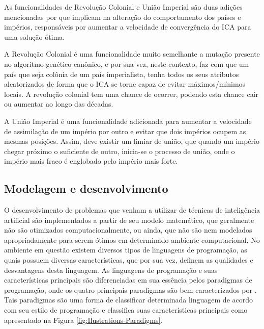 As funcionalidades de Revolução Colonial e União Imperial são duas adições mencionadas por \cite{roche2011imperialist} que implicam na alteração do comportamento dos países e impérios, responsáveis por aumentar a velocidade de convergência do ICA para uma solução ótima. 

A Revolução Colonial é uma funcionalidade muito semelhante a mutação presente no algoritmo genético canônico, e por sua vez, neste contexto, faz com que um país que seja colônia de um país imperialista, tenha todos os seus atributos aleatorizados de forma que o ICA se torne capaz de evitar máximos/mínimos locais. A revolução colonial tem uma chance de ocorrer, podendo esta chance cair ou aumentar ao longo das décadas.

A União Imperial é uma funcionalidade adicionada para aumentar a velocidade de assimilação de um império por outro e evitar que dois impérios ocupem as mesmas posições. Assim, deve existir um limiar de união, que quando um império chegar próximo o suficiente de outro, inicia-se o processo de união, onde o império mais fraco é englobado pelo império mais forte.
    
    
    
    
    
    
    
    
    
    
    
\subsection{Modelagem e desenvolvimento}
\label{Modelagem e desenvolvimento}

O desenvolvimento de problemas que venham a utilizar de técnicas de inteligência artificial são implementados a partir de seu modelo matemático, que geralmente não são otimizados computacionalmente, ou ainda, que não são nem modelados apropriadamente para serem ótimos em determinado ambiente computacional. No ambiente em questão existem diversos tipos de linguagens de programação, as quais possuem diversas características, que por sua vez, definem as qualidades e desvantagens desta linguagem. As linguagens de programação e suas características principais são diferenciadas em sua essência pelos paradigmas de programação, onde os quatro principais paradigmas são bem caracterizados por  \cite{normark2013overview}. Tais paradigmas são uma forma de classificar determinada linguagem de acordo com seu estilo de programação e classifica suas características principais como apresentado na Figura \ref{fig:Ilustrations-Paradigms}.


